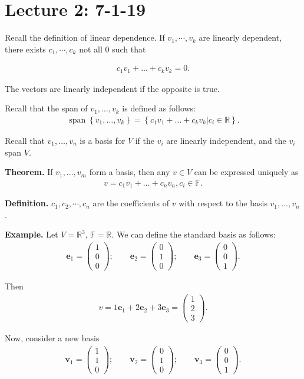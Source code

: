 \documentclass{article}
\newcommand{\mat}[1]{\begin{pmatrix}#1\end{pmatrix}}
\newcommand{\RR}{\mathbb{R}}
\newcommand{\mbf}{\mathbf}
\DeclareMathOperator{\Span}{span}
\begin{document}
\section{Lecture 2: 7-1-19}

Recall the definition of linear dependence.  If $v_1, \cdots, v_k$ are linearly dependent, there exists $c_1, \cdots, c_k$ not all 0 such that

\begin{align*}
  c_1 v_1 + \dots + c_k v_k = 0.
\end{align*}

The vectors are linearly independent if the opposite is true.

Recall that the span of $v_1, \dots, v_k$ is defined as follows:
\begin{align*}
  \Span \left\{ v_1, \dots, v_k \right\} = \left\{ c_1 v_1 + \dots + c_k v_k | c_i \in \RR \right\}.
\end{align*}

Recall that $v_1, \dots, v_n$ is a basis for $V$ if the $v_i$ are linearly independent, and the $v_i$ span $V$.

{\bf Theorem.} If $v_1, \dots, v_m$ form a basis, then any $v \in V$ can be expressed uniquely as
\begin{align*}
  v = c_1 v_1 + \dots + c_n v_n, c_i \in \mathbb{F}.
\end{align*}

{\bf Definition.} $c_1, c_2, \cdots, c_n$ are the coefficients of $v$ with respect to the basis $v_1, \dots, v_n$.

{\bf Example.} Let $V = \mathbb{R}^3$, $\mathbb{F} = \mathbb{R}$.  We can define the standard basis as follows:
\begin{align*}
  \mbf{e}_1 = \mat{1 \\ 0 \\ 0}; \qquad \mbf{e}_2 = \mat{0 \\ 1 \\ 0}; \qquad \mbf{e}_3 = \mat{0 \\ 0 \\ 1}.
\end{align*}

Then
\begin{align*}
  v = 1 \mbf{e}_1 + 2 \mbf{e}_2 + 3\mbf{e}_3 = \mat{1 \\ 2 \\ 3}.
\end{align*}

Now, consider a new basis
\begin{align*}
  \mbf{v}_1 = \mat{1 \\ 1 \\ 0}; \qquad \mbf{v}_2 = \mat{0 \\ 1 \\ 0}; \qquad \mbf{v}_3 = \mat{0 \\ 0 \\ 1}.
\end{align*}
\end{document}
